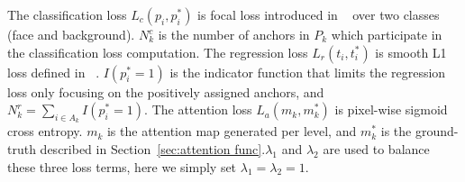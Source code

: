 \documentclass[10pt,twocolumn,letterpaper]{article}
\begin{document}
The classification loss $ L_c(p_i, p_i^*) $ is focal loss introduced in ~\cite{lin2017focal} over two classes (face and background). $ N_k^c $ is the number of anchors in $ P_k $ which participate in the classification loss computation. The regression loss $ L_r(t_i, t_i^*) $ is smooth L1 loss defined in ~\cite{girshick2015fast}. $ I(p_i^*=1) $ is the indicator function that limits the regression loss only focusing on the positively assigned anchors, and $ N_k^r=\sum_{i\in A_k}{I(p_i^*=1)} $. The attention loss $ L_a(m_k, m_k^*) $ is pixel-wise sigmoid cross entropy. $ m_k $ is the attention map generated per level, and $ m_k^* $ is the ground-truth described in Section~\ref{sec:attention func}.$ \lambda_1 $ and $ \lambda_2 $ are used to balance these three loss terms, here we simply set $ \lambda_1=\lambda_2=1 $.



\end{document}
